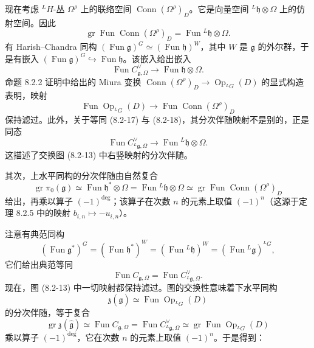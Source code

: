 
现在考虑 ${}^LH$-丛 $\Omega^{\rho}$ 上的联络空间 $\operatorname{Conn}(\Omega^{\rho})_D$。它是向量空间 ${}^L\mathfrak h\otimes\Omega$ 上的仿射空间。因此
\begin{equation}
    \operatorname{gr}\operatorname{Fun}\operatorname{Conn}(\Omega^{\rho})_D=\operatorname{Fun}{}^L\mathfrak h\otimes\Omega.
    \tag{8.2-18}
\end{equation}
有 Harish--Chandra 同构 $(\operatorname{Fun}\mathfrak g)^G\simeq(\operatorname{Fun}\mathfrak h)^W$，其中 $W$ 是 $\mathfrak g$ 的外尔群，于是有嵌入 $(\operatorname{Fun}\mathfrak g)^G\hookrightarrow\operatorname{Fun}\mathfrak h$。该嵌入给出嵌入
\[
    \operatorname{Fun}C^\vee_{\mathfrak g,\Omega}\longrightarrow\operatorname{Fun}\mathfrak h\otimes\Omega.
\]
命题 8.2.2 证明中给出的 Miura 变换 $\operatorname{Conn}(\Omega^{\rho})_D\to\operatorname{Op}_{{}^LG}(D)$ 的显式构造表明，映射
\[
    \operatorname{Fun}\operatorname{Op}_{{}^LG}(D)\longrightarrow\operatorname{Fun}\operatorname{Conn}(\Omega^{\rho})_D
\]
保持滤过。此外，关于等同 (8.2-17) 与 (8.2-18)，其分次伴随映射不是别的，正是同态
\[
    \operatorname{Fun}C^\vee_{{}^L\mathfrak g,\Omega}\longrightarrow\operatorname{Fun}{}^L\mathfrak h\otimes\Omega.
\]
这描述了交换图 (8.2-13) 中右竖映射的分次伴随。

其次，上水平同构的分次伴随由自然复合
\[
    \operatorname{gr}\pi_0(\mathfrak g)\simeq\operatorname{Fun}\mathfrak h^*\otimes\Omega=\operatorname{Fun}{}^L\mathfrak h\otimes\Omega\simeq\operatorname{gr}\operatorname{Fun}\operatorname{Conn}(\Omega^{\rho})_D
\]
给出，再乘以算子 $(-1)^{\deg}$；该算子在次数 $n$ 的元素上取值 $(-1)^n$（这源于定理 8.2.5 中的映射 $b_{i,n}\mapsto-u_{i,n}$）。

注意有典范同构
\[
    (\operatorname{Fun}\mathfrak g^*)^G=(\operatorname{Fun}\mathfrak h^*)^W=(\operatorname{Fun}{}^L\mathfrak h)^W=(\operatorname{Fun}{}^L\mathfrak g)^{{}^LG},
\]
它们给出典范等同
\[
    \operatorname{Fun}C_{\mathfrak g,\Omega}=\operatorname{Fun}C^\vee_{{}^L\mathfrak g,\Omega}.
\]
现在，图 (8.2-13) 中一切映射都保持滤过。图的交换性意味着下水平同构
\begin{equation}
    \mathfrak z(\hat{\mathfrak g})\simeq\operatorname{Fun}\operatorname{Op}_{{}^LG}(D)
    \tag{8.2-19}
\end{equation}
的分次伴随，等于复合
\[
    \operatorname{gr}\mathfrak z(\hat{\mathfrak g})\simeq\operatorname{Fun}C_{\mathfrak g,\Omega}=\operatorname{Fun}C^\vee_{{}^L\mathfrak g,\Omega}\simeq\operatorname{gr}\operatorname{Fun}\operatorname{Op}_{{}^LG}(D)
\]
乘以算子 $(-1)^{\deg}$，它在次数 $n$ 的元素上取值 $(-1)^n$。于是得到：

